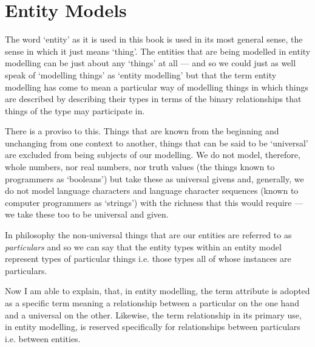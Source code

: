 

\section{Entity Models}
\label{EntityModels}
\mynote The word `entity' as it is used in this book is used in its most general sense,  the sense in which it just means `thing'. The entities that are being modelled in entity modelling can be just about any `things' at all --- and so we could just as well speak of `modelling things' as `entity modelling' but that the term entity modelling
has come to mean a particular way of modelling things in which things are described by describing their types in terms of the binary relationships that things of the type may participate in.

\mynote There is a proviso to this. 
Things that are known from the beginning and unchanging from one context to another, things that can be said to be `universal' are excluded from being subjects of our modelling. We do not model, therefore, whole numbers, nor real numbers, nor truth values 
(the things known to programmers as `booleans') but take these as universal givens and, generally, 
we do not model language characters and language character sequences 
(known to computer programmers as `strings') with the richness that this would require --- we take these too to be universal and given. 

\mynote In philosophy the non-universal things that are our entities are referred to as \textit{particulars} and so we can say that the entity types within an entity model represent types of particular things i.e. those types all of whose instances are particulars.  

\mynote Now I am able to explain, that, in entity modelling, the term attribute is adopted as a specific term meaning a relationship between a particular on the one hand and a universal on the other. 
Likewise, the term relationship 
in its primary use, in entity modelling, is reserved specifically for relationships between particulars 
i.e. between entities. 

